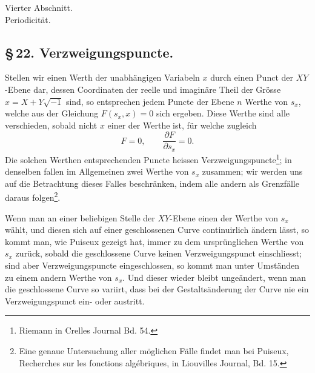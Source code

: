 \documentclass[10pt]{article}
\begin{document}
\begin{center}
{\large Vierter Abschnitt.}\\[0.35em]
{\Large Periodicität.}
\end{center}

\subsection*{\S\,22. Verzweigungspuncte.}

Stellen wir einen Werth der unabhängigen Variabeln \(x\) durch einen Punct der \(XY\)-Ebene dar, dessen Coordinaten der reelle und imaginäre Theil der Grösse \(x=X+Y\sqrt{-1}\) sind, so entsprechen jedem Puncte der Ebene \(n\) Werthe von \(s_x\), welche aus der Gleichung \(F(s_x,x)=0\) sich ergeben. Diese Werthe sind alle verschieden, sobald nicht \(x\) einer der Werthe ist, für welche zugleich
\[
F=0,\qquad \frac{\partial F}{\partial s_x}=0.
\]
Die solchen Werthen entsprechenden Puncte heissen Verzweigungspuncte\footnote{Riemann in Crelles Journal Bd. 54.}; in denselben fallen im Allgemeinen zwei Werthe von \(s_x\) zusammen; wir werden uns auf die Betrachtung dieses Falles beschränken, indem alle andern als Grenzfälle daraus folgen\footnote{Eine genaue Untersuchung aller möglichen Fälle findet man bei Puiseux, Recherches sur les fonctions algébriques, in Liouvilles Journal, Bd. 15.}.

Wenn man an einer beliebigen Stelle der \(XY\)-Ebene einen der Werthe von \(s_x\) wählt, und diesen sich auf einer geschlossenen Curve continuirlich ändern lässt, so kommt man, wie Puiseux gezeigt hat, immer zu dem ursprünglichen Werthe von \(s_x\) zurück, sobald die geschlossene Curve keinen Verzweigungspunct einschliesst; sind aber Verzweigungspuncte eingeschlossen, so kommt man unter Umständen zu einem andern Werthe von \(s_x\). Und dieser wieder bleibt ungeändert, wenn man die geschlossene Curve so variirt, dass bei der Gestaltsänderung der Curve nie ein Verzweigungspunct ein- oder austritt.
\end{document}

